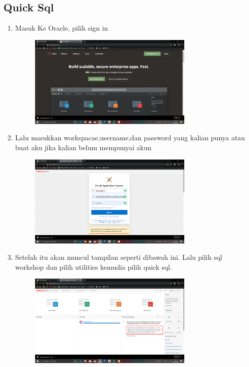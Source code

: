 \documentclass{article}
\begin{document}
\begin{enumerate}
\newpage \section{Quick Sql}
\begin{enumerate}
    \item Masuk Ke Oracle, pilih sign in
\begin{figure}[h]
            \centerline{\includegraphics[width=8cm]{image/1.png}}
            \end{figure}
    \item Lalu masukkan workspacae,username,dan password yang kalian punya atau buat aku jika kalian belum mempunyai akun
    \begin{figure}[h]
            \centerline{\includegraphics[width=8cm]{image/2.png}}
            \end{figure}
    \newpage \item Setelah itu akan muncul tampilan seperti dibawah ini. Lalu pilih sql workshop dan pilih utilities kemudia pilih quick sql.
    \begin{figure}[h]
            \centerline{\includegraphics[width=8cm]{image/3.png}}
            \end{figure}

\end{enumerate}
\end{enumerate}
\end{document}
